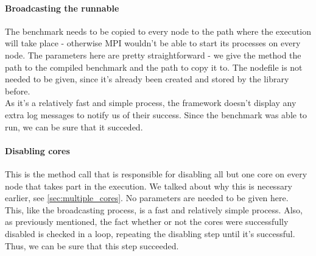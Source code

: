 \paragraph{Broadcasting the runnable}
The benchmark needs to be copied to every node to the path where the
execution will take place - otherwise MPI wouldn't be able to start
its processes on every node. The parameters here are pretty
straightforward - we give the method the path to the compiled
benchmark and the path to copy it to. The nodefile is not needed to be
given, since it's already been created and stored by the library
before.\\[0.3cm]
As it's a relatively fast and simple process, the framework doesn't
display any extra log messages to notify us of their success. Since
the benchmark was able to run, we can be sure that it succeded.
\paragraph{Disabling cores}
This is the method call that is responsible for disabling all but one
core on every node that takes part in the execution. We talked about
why this is necessary earlier, see \ref{sec:multiple_cores}. No
parameters are needed to be given here.\\[0.3cm]
This, like the broadcasting process, is a fast and relatively simple
process. Also, as previously mentioned, the fact whether or not the
cores were successfully disabled is checked in a loop, repeating the
disabling step until it's successful. Thus, we can be sure that this
step succeeded.
